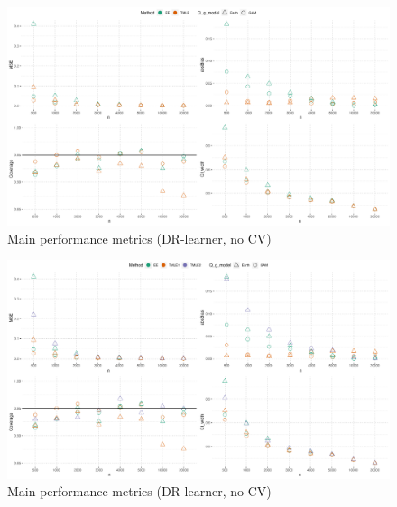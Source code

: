 \documentclass[
]{article}
\begin{document}
\begin{figure}[H]

{\centering \includegraphics[width=1\linewidth]{plot_dots_dr_nocv_v} 

}

\caption{Main performance metrics (DR-learner, no CV)}\label{fig:unnamed-chunk-19}
\end{figure}

\begin{figure}[H]

{\centering \includegraphics[width=1\linewidth]{plot_dots_dr_nocv_new_v} 

}

\caption{Main performance metrics (DR-learner, no CV)}\label{fig:unnamed-chunk-20}
\end{figure}
\end{document}
